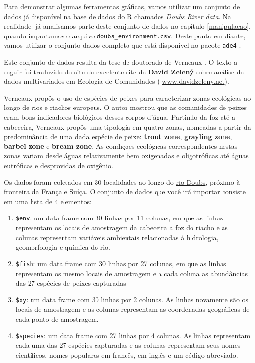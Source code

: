 \documentclass[
]{book}
\begin{document}
Para demonstrar algumas ferramentas gráficas, vamos utilizar um conjunto de dados já disponível na base de dados do R chamados \emph{Doubs River data}. Na realidade, já analisamos parte deste conjunto de dados no capítulo \ref{manipulacao}, quando importamos o arquivo \texttt{doubs\_environment.csv}. Deste ponto em diante, vamos utilizar o conjunto dados completo que está disponível no pacote \texttt{ade4} \citep{dray2015ade}.

Este conjunto de dados resulta da tese de doutorado de Verneaux \citep{Verneaux1973}. O texto a seguir foi traduzido do site do excelente site de \textbf{David Zelený} sobre análise de dados multivariados em Ecologia de Comunidades ( \href{https://www.davidzeleny.net/anadat-r/doku.php/en:data:doubs}{www.davidzeleny.net}).

Verneaux \citep{Verneaux1973} propôs o uso de espécies de peixes para caracterizar zonas ecológicas ao longo de rios e riachos europeus. O autor mostrou que as comunidades de peixes eram bons indicadores biológicos desses corpos d'água. Partindo da foz até a cabeceira, Verneaux propôs uma tipologia em quatro zonas, nomeadas a partir da predominância de uma dada espécie de peixe: \textbf{trout zone}, \textbf{grayling zone}, \textbf{barbel zone} e \textbf{bream zone}. As condições ecológicas correspondentes nestas zonas variam desde águas relativamente bem oxigenadas e oligotróficas até águas eutróficas e desprovidas de oxigênio.

Os dados foram coletados em 30 localidades ao longo do \href{https://pt.wikipedia.org/wiki/Rio_Doubs}{rio Doubs}, próximo à fronteira da França e Suíça. O conjunto de dados que você irá importar consiste em uma lista de 4 elementos:

\begin{enumerate}
\def\labelenumi{\arabic{enumi}.}
\item
  \texttt{\$env}: um data frame com 30 linhas por 11 colunas, em que as linhas representam os locais de amostragem da cabeceira a foz do riacho e as colunas representam variáveis ambientais relacionadas à hidrologia, geomorfologia e química do rio.
\item
  \texttt{\$fish}: um data frame com 30 linhas por 27 colunas, em que as linhas representam os mesmo locais de amostragem e a cada coluna as abundâncias das 27 espécies de peixes capturadas.
\item
  \texttt{\$xy}: um data frame com 30 linhas por 2 colunas. As linhas novamente são os locais de amostragem e as colunas representam as coordenadas geográficas de cada ponto de amostragem.
\item
  \texttt{\$species}: um data frame com 27 linhas por 4 colunas. As linhas representam cada uma das 27 espécies capturadas e as colunas representam seus nomes científicos, nomes populares em francês, em inglês e um código abreviado.
\end{enumerate}
\end{document}
